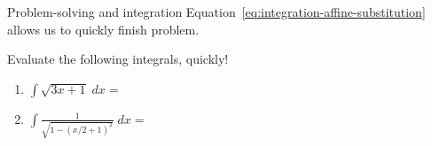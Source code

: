 \documentclass[../main.tex]{subfiles}
\begin{document}
\begin{lesson}{Problem-solving and integration}
  Equation~\eqref{eq:integration-affine-substitution} allows us to quickly finish problem.
  \begin{example}
    Evaluate the following integrals, quickly!

    \begin{enumerate}[itemsep=5ex]
      \item \(\int \sqrt{3x + 1} \;dx = \)
      \item \(\int \frac{1}{\sqrt{1 - (x/2 + 1)^2}} \;dx = \)
    \end{enumerate}
  \end{example}
\end{lesson}
\end{document}
